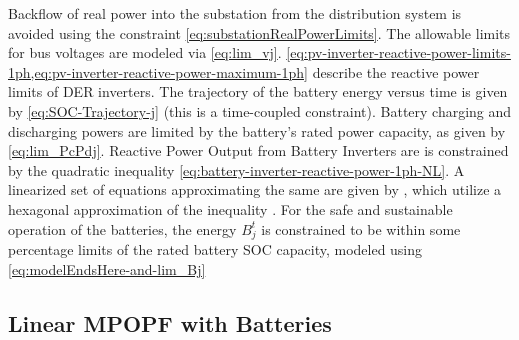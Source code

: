 \documentclass[../../outputs/main.tex]{subfiles}
\begin{document}

Backflow of real power into the substation from the distribution system is avoided using the constraint \cref{eq:substationRealPowerLimits}. The allowable limits for bus voltages are modeled via \cref{eq:lim_vj}. \cref{eq:pv-inverter-reactive-power-limits-1ph,eq:pv-inverter-reactive-power-maximum-1ph} describe the reactive power limits of DER inverters. The trajectory of the battery energy versus time is given by \cref{eq:SOC-Trajectory-j} (this is a time-coupled constraint). Battery charging and discharging powers are limited by the battery's rated power capacity, as given by \cref{eq:lim_PcPdj}. 
Reactive Power Output from Battery Inverters are is constrained by the quadratic inequality \cref{eq:battery-inverter-reactive-power-1ph-NL}. A linearized set of equations approximating the same are given by ,  which utilize a hexagonal approximation of the inequality \cite{Ahmadi2014Oct}. For the safe and sustainable operation of the batteries, the energy $B^{t}_{j}$ is constrained to be within some percentage limits of the rated battery SOC capacity, modeled using \cref{eq:modelEndsHere-and-lim_Bj}

\subsection{Linear MPOPF with Batteries}

\end{document}
